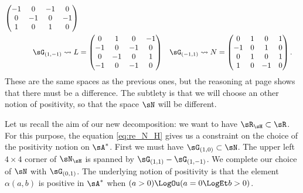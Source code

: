 \begin{equation}
\begin{aligned}[]
\begin{pmatrix}
			-1 & 0  & -1 & 0  \\
			0  & -1 & 0  & -1 \\
			1  & 0  & 1  & 0
		\end{pmatrix}                                        \\
		\sG_{(1,-1)}\leadsto L    & =
		\begin{pmatrix}
			0  & 1  & 0  & -1 \\
			-1 & 0  & -1 & 0  \\
			0  & -1 & 0  & 1  \\
			-1 & 0  & -1 & 0
		\end{pmatrix}
		                          & \sG_{(-1,1)}\leadsto N   & =
		\begin{pmatrix}
			0  & 1 & 0  & 1 \\
			-1 & 0 & 1  & 0 \\
			0  & 1 & 0  & 1 \\
			1  & 0 & -1 & 0
		\end{pmatrix}.
	\end{aligned}
\end{equation}
These are the same spaces as the previous ones, but the reasoning at page \pageref{pg:subt_tilde} shows that there must be a difference. The subtlety is that we will choose an other notion of positivity, so that the space $\sN$ will be different.

\newcommand{\CaptionFigHNxitLj}{The root space}


Let us recall the aim of our new decomposition: we want to have $\sR_{\sH}\subset\sR$. For this purpose, the equation \eqref{eq:re_N_H} gives us a constraint on the choice of the positivity notion on $\sA^*$. First we must have $\sG_{(1,0)}\subset\sN$. The upper left $4\times 4$ corner of $\sN_{\sH}$ is spanned by $\sG_{(1,1)}-\sG_{(1,-1)}$. We complete our choice of $\sN$ with $\sG_{(0,1)}$. The underlying notion of positivity is that the element $\alpha(a,b)$ is positive in $\sA^*$ when $ (a>0) \LogOu(a=0 \LogEt b>0)$.

